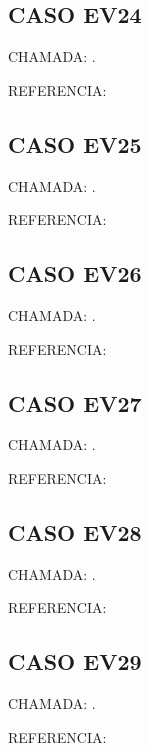 \documentclass{undftex}
\begin{document}
\begin{refsection}\section*{CASO EV24} CHAMADA: . \textcite{ev24}\par REFERENCIA:\par\printbibliography[heading=none,check=undfconsultadas]\end{refsection}\clearpage
\begin{refsection}\section*{CASO EV25} CHAMADA: . \textcite{ev25}\par REFERENCIA:\par\printbibliography[heading=none,check=undfconsultadas]\end{refsection}\clearpage
\begin{refsection}\section*{CASO EV26} CHAMADA: . \textcite{ev26}\par REFERENCIA:\par\printbibliography[heading=none,check=undfconsultadas]\end{refsection}\clearpage
\begin{refsection}\section*{CASO EV27} CHAMADA: . \textcite{ev27}\par REFERENCIA:\par\printbibliography[heading=none,check=undfconsultadas]\end{refsection}\clearpage
\begin{refsection}\section*{CASO EV28} CHAMADA: . \textcite{ev28}\par REFERENCIA:\par\printbibliography[heading=none,check=undfconsultadas]\end{refsection}\clearpage
\begin{refsection}\section*{CASO EV29} CHAMADA: . \textcite{ev29}\par REFERENCIA:\par\printbibliography[heading=none,check=undfconsultadas]\end{refsection}\clearpage
\end{document}
